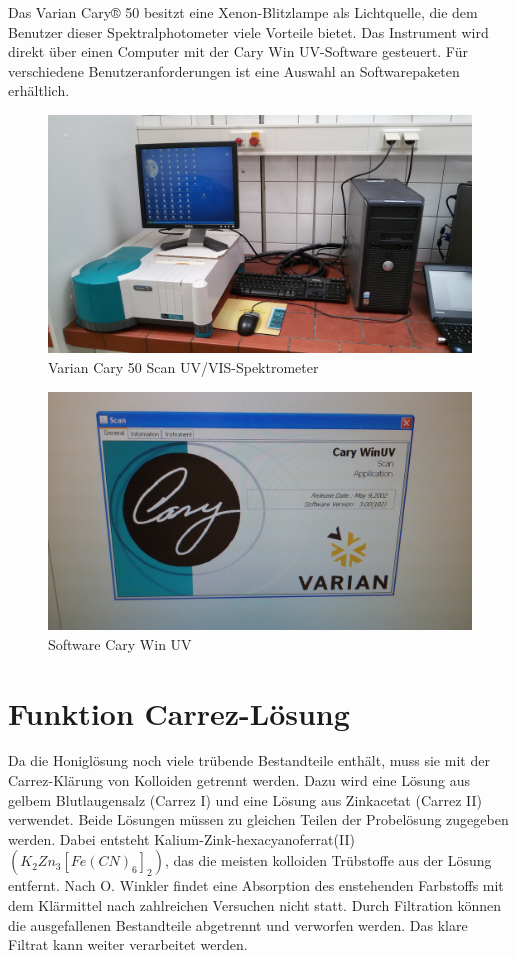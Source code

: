 Das Varian Cary® 50 besitzt eine Xenon-Blitzlampe als Lichtquelle, die dem Benutzer dieser
Spektralphotometer viele Vorteile bietet. Das Instrument wird direkt über einen Computer mit
der Cary Win UV-Software gesteuert. Für verschiedene Benutzeranforderungen ist eine Auswahl
an Softwarepaketen erhältlich.
\begin{figure}[htbp]
	\centering
		\includegraphics[width=1.00\textwidth]{../Bilder/20150504_140611.jpg}
	\caption{Varian Cary 50 Scan UV/VIS-Spektrometer}
	\label{fig:Spektrometer}
\end{figure}

\begin{figure}[htbp]
	\centering
		\includegraphics[width=1.00\textwidth]{../Bilder/20150504_140635.jpg}
	\caption{Software Cary Win UV}
	\label{fig:Software}
\end{figure}


\section{Funktion Carrez-Lösung}
Da die Honiglösung noch viele trübende Bestandteile enthält, muss sie mit der Carrez-Klärung von Kolloiden getrennt werden. Dazu wird eine Lösung aus gelbem Blutlaugensalz (Carrez I) und eine Lösung aus Zinkacetat (Carrez II) verwendet. Beide Lösungen müssen zu gleichen Teilen der Probelösung zugegeben werden. Dabei entsteht Kalium-Zink-hexacyanoferrat(II) $(K_{2}Zn_{3}[Fe(CN)_{6}]_{2})$, das die meisten kolloiden Trübstoffe aus der Lösung entfernt. Nach O. Winkler findet eine Absorption des enstehenden Farbstoffs mit dem Klärmittel nach zahlreichen Versuchen nicht statt. Durch Filtration können die ausgefallenen Bestandteile abgetrennt und verworfen werden. Das klare Filtrat kann weiter verarbeitet werden.~\cite{Winkler} %

